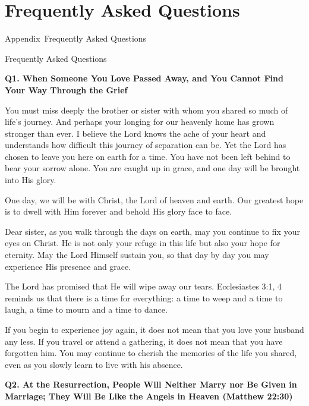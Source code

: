 \appendix
\setcounter{figure}{0} 
\renewcommand{\thesection}{Appendix~\Alph{chapter}.\arabic{section}}
\chapter*{Frequently Asked Questions} 
%
         {Appendix~\thechapter\quad Frequently Asked Questions}
 {\protect{}}
 {\protect\numberline{\thechapter} Frequently Asked Questions}

\def\theHfigure{appendix.\arabic{figure}}

\noindent \textbf{Q1. When Someone You Love Passed Away, and You Cannot Find Your Way Through the Grief}

You must miss deeply the brother or sister with whom you shared so much of life's journey. And perhaps your longing for our heavenly home has grown stronger than ever. I believe the Lord knows the ache of your heart and understands how difficult this journey of separation can be. Yet the Lord has chosen to leave you here on earth for a time. You have not been left behind to bear your sorrow alone. You are caught up in grace, and one day will be brought into His glory.

One day, we will be with Christ, the Lord of heaven and earth. Our greatest hope is to dwell with Him forever and behold His glory face to face. 

Dear sister, as you walk through the days on earth, may you continue to fix your eyes on Christ. He is not only your refuge in this life but also your hope for eternity. May the Lord Himself sustain you, so that day by day you may experience His presence and grace.

The Lord has promised that He will wipe away our tears.
Ecclesiastes 3:1, 4 reminds us that there is a time for everything: a time to weep and a time to laugh, a time to mourn and a time to dance.

If you begin to experience joy again, it does not mean that you love your husband any less. If you travel or attend a gathering, it does not mean that you have forgotten him. You may continue to cherish the memories of the life you shared, even as you slowly learn to live with his absence. 

\vspace{0.3cm}

\noindent \textbf{Q2. At the Resurrection, People Will Neither Marry nor Be Given in Marriage; They Will Be Like the Angels in Heaven (Matthew 22:30)}

